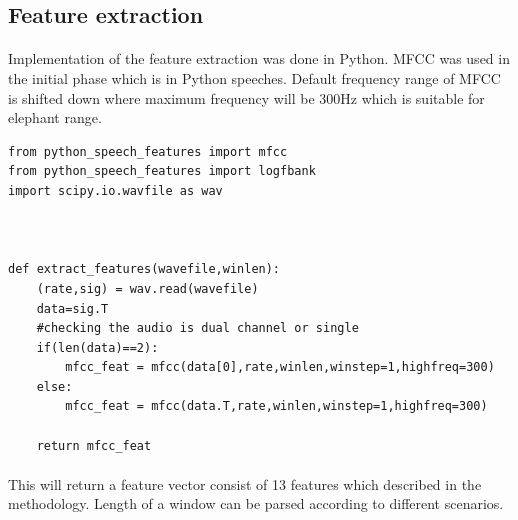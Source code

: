 \documentclass[12pt]{article}
\numberwithin{figure}{section}
\numberwithin{table}{section}
\begin{document}
\newpage
\subsection{Feature extraction}
\paragraph{}
Implementation of the feature extraction was done in Python. MFCC was used in the initial phase which is in Python speeches. Default frequency range of MFCC is shifted down where maximum frequency will be 300Hz which is suitable for elephant range.
\begin{lstlisting}
from python_speech_features import mfcc
from python_speech_features import logfbank
import scipy.io.wavfile as wav



def extract_features(wavefile,winlen):
    (rate,sig) = wav.read(wavefile)
    data=sig.T
    #checking the audio is dual channel or single
    if(len(data)==2):
        mfcc_feat = mfcc(data[0],rate,winlen,winstep=1,highfreq=300)
    else:
        mfcc_feat = mfcc(data.T,rate,winlen,winstep=1,highfreq=300)
        
    return mfcc_feat
\end{lstlisting}

\paragraph{}
This will return a feature vector consist of 13 features which described in the methodology. Length of a window can be parsed according to different scenarios.

\newpage
\end{document}
